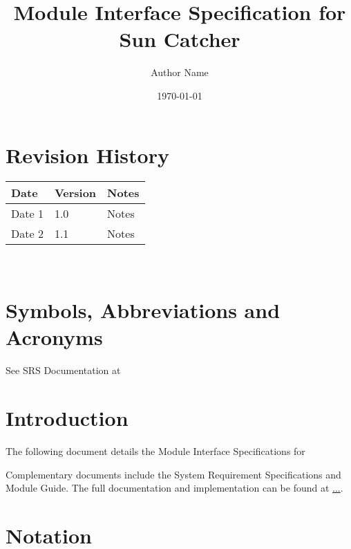 \documentclass[12pt, titlepage]{article}
\newcommand{\progname}{Sun Catcher}
\begin{document}
\title{Module Interface Specification for \progname}

\author{Author Name}

\date{\today}

\maketitle


\section{Revision History}

\begin{tabularx}{\textwidth}{p{3cm}p{2cm}X}
\toprule {\bf Date} & {\bf Version} & {\bf Notes}\\
\midrule
Date 1 & 1.0 & Notes\\
Date 2 & 1.1 & Notes\\
\bottomrule
\end{tabularx}

~\newpage

\section{Symbols, Abbreviations and Acronyms}

See SRS Documentation at 


\newpage

\tableofcontents

\newpage


\section{Introduction}

The following document details the Module Interface Specifications for

Complementary documents include the System Requirement Specifications
and Module Guide.  The full documentation and implementation can be
found at \url{...}.  

\section{Notation}
\end{document}

